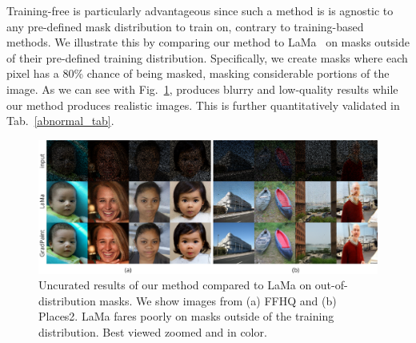 Training-free is particularly advantageous since such a method is is agnostic to any 
pre-defined mask distribution to train on, contrary to training-based methods. We 
illustrate this by comparing our method to LaMa~\citep{lama} on masks outside of 
their pre-defined training distribution. Specifically, we create masks where each 
pixel has a 80\% chance of being masked, masking considerable portions of the image. 
As we can see with Fig.~\ref{fig:ood}, \cite{lama} produces blurry and low-quality
 results while our method produces realistic images. This is further quantitatively 
 validated in Tab.~\ref{abnormal_tab}. 

\begin{figure}[htbp]
  \centering
    \includegraphics[width=\linewidth]{images/gradpaint/abnormal_masks.pdf}
    \caption{Uncurated results of our method compared to LaMa on out-of-distribution masks. We show images from (a) FFHQ and (b) Places2. LaMa fares poorly on masks outside of the training distribution. Best viewed zoomed and in color.}
    \label{fig:ood}
\end{figure}





